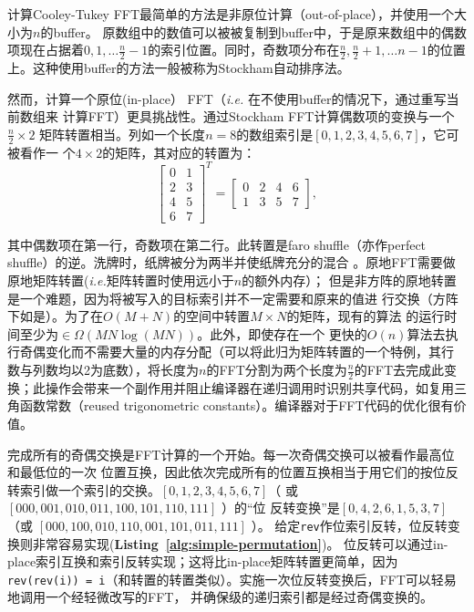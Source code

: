 \documentclass[10pt]{article}
\begin{document}
\begin{CJK*}{UTF8}{gbsn}
计算Cooley-Tukey FFT最简单的方法是非原位计算（out-of-place），并使用一个大小为$n$的buffer。
原数组中的数值可以被被复制到buffer中，于是原来数组中的偶数项现在占据着$0, 1, \ldots
\frac{n}{2}-1$的索引位置。同时，奇数项分布在$\frac{n}{2}, \frac{n}{2}+1, \ldots n-1$的位置上。这种使用buffer的方法一般被称为Stockham自动排序法。\cite{cochran:fast}



然而，计算一个原位(in-place） FFT（\emph{i.e.} 在不使用buffer的情况下，通过重写当前数组来
计算FFT）更具挑战性。通过Stockham FFT计算偶数项的变换与一个$\frac{n}{2} \times 2$
矩阵转置相当。列如一个长度$n=8$的数组索引是$[0, 1, 2, 3, 4, 5, 6, 7]$，它可被看作一
个$4 \times 2$的矩阵，其对应的转置为：
\[ 
\left[
  \begin{matrix}
    0 & 1\\
    2 & 3\\
    4 & 5\\
    6 & 7
  \end{matrix}
\right]^T = 
\left[
  \begin{matrix}
    0 & 2 & 4 & 6\\
    1 & 3 & 5 & 7
  \end{matrix}
\right],
\]



其中偶数项在第一行，奇数项在第二行。此转置是faro shuffle（亦作perfect
shuffle）的逆\cite{sedgewick:algorithms}。洗牌时，纸牌被分为两半并使纸牌充分的混合
。原地FFT需要做原地矩阵转置(\emph{i.e.}矩阵转置时使用远小于$n$的额外内存）；
但是非方阵的原地转置是一个难题，因为将被写入的目标索引并不一定需要和原来的值进
行交换（方阵下如是）。为了在$O(M + N)$的空间中转置$M \times N$的矩阵，现有的算法
的运行时间至少为$\in\Omega(M N \log(M N))$\cite{fich:permuting}。此外，即使存在一个
更快的$O(n)$算法去执行奇偶变化而不需要大量的内存分配（可以将此归为矩阵转置的一个特例，其行
数与列数均以2为底数），将长度为$n$的FFT分割为两个长度为$\frac{n}{2}$的FFT去完成此变换；此操作会带来一个副作用并阻止编译器在递归调用时识别共享代码，如复用三角函数常数（reused trigonometric constants）。编译器对于FFT代码的优化很有价值\cite{myrnyy:simple}。

完成所有的奇偶交换是FFT计算的一个开始。每一次奇偶交换可以被看作最高位和最低位的一次
位置互换，因此依次完成所有的位置互换相当于用它们的按位反转索引做一个索引的交换。$[0, 1, 2, 3, 4, 5, 6, 7]$（
或$[000,001, 010, 011, 100, 101, 110, 111]$ ）的“位
反转变换”是$[0, 4, 2,6, 1, 5, 3, 7]$ （或 $[000, 100, 010, 110, 001, 101, 011, 111]$ ）。
给定{\tt rev}作位索引反转，位反转变换则非常容易实现({\bf Listing~\ref{alg:simple-permutation}})。
位反转可以通过in-place索引互换和索引反转实现；这将比in-place矩阵转置更简单，因为
{\tt rev(rev(i)) = i}（和转置的转置类似）。实施一次位反转变换后，FFT可以轻易地调用一个经轻微改写的FFT，
并确保级的递归索引都是经过奇偶变换的。



\end{CJK*}
\end{document}
